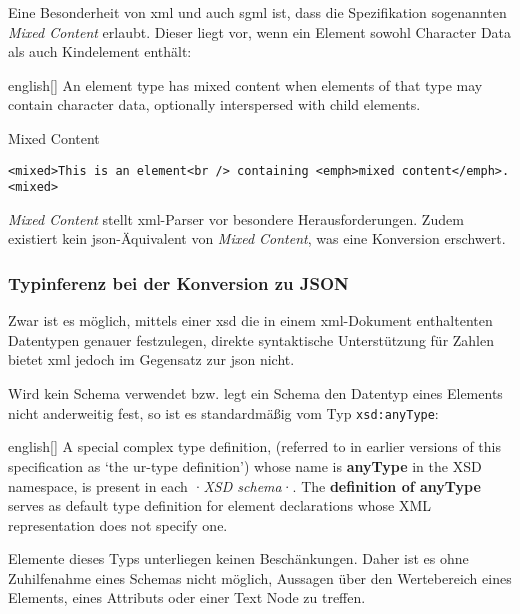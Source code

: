 Eine Besonderheit von \acrshort{xml} und auch \acrshort{sgml} ist, dass die Spezifikation sogenannten \emph{Mixed Content} erlaubt. Dieser liegt vor, wenn ein Element sowohl Character Data als auch Kindelement enthält:

\begin{foreigndisplayquote}{english}[{\cite[Abschnitt 3.2.2]{maler2008xml}}]
    An element type has mixed content when elements of that type may contain character data, optionally interspersed with child elements.
\end{foreigndisplayquote}

\begin{example} Mixed Content
    \begin{verbatim}
<mixed>This is an element<br /> containing <emph>mixed content</emph>.<mixed>
    \end{verbatim}
\end{example}

\emph{Mixed Content} stellt \acrshort{xml}-Parser vor besondere Herausforderungen\cite{mcgrath2002mixedcontent}. Zudem existiert kein \acrshort{json}-Äquivalent von \emph{Mixed Content}, was eine Konversion erschwert.

\subsubsection{Typinferenz bei der Konversion zu JSON}

Zwar ist es möglich, mittels einer \acrfull{xsd} die in einem \acrshort{xml}-Dokument enthaltenten Datentypen genauer festzulegen, direkte syntaktische Unterstützung für Zahlen bietet \acrshort{xml} jedoch im Gegensatz zur \acrlong{json} nicht.

Wird kein Schema verwendet bzw. legt ein Schema den Datentyp eines Elements nicht anderweitig fest, so ist es standardmäßig vom Typ \texttt{xsd:anyType}:

\begin{foreigndisplayquote}{english}[{\cite[Abschnitt 2.2.1.1]{xmlschema11-1}}]
    A special complex type definition, (referred to in earlier versions of this specification as `the ur-type definition') whose name is \textbf{anyType} in the XSD namespace, is present in each ·\emph{XSD schema}·. The \textbf{definition of anyType} serves as default type definition for element declarations whose XML representation does not specify one.
\end{foreigndisplayquote}

Elemente dieses Typs unterliegen keinen Beschänkungen. Daher ist es ohne Zuhilfenahme eines Schemas nicht möglich, Aussagen über den Wertebereich eines Elements, eines Attributs oder einer Text Node zu treffen.

